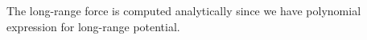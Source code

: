 \documentclass[11pt,letter,nocenter]{revtex4-1}
\begin{document}

The long-range force is computed analytically since we have polynomial expression for long-range potential. 

    

%
%
\end{document}

